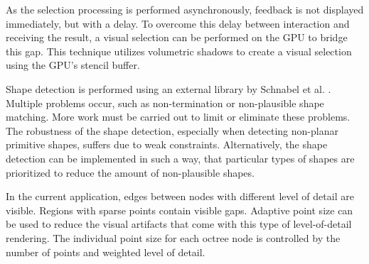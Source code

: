 \par

As the selection processing is performed asynchronously, feedback is not displayed immediately, but with a delay. To overcome this delay between interaction and receiving the result, a visual selection can be performed on the GPU \cite{rainer2016visual} to bridge this gap. This technique utilizes volumetric shadows to create a visual selection using the GPU's stencil buffer. 

\par

Shape detection is performed using an external library by Schnabel et al. \cite{schnabel-2007-software}. Multiple problems occur, such as non-termination or non-plausible shape matching. More work must be carried out to limit or eliminate these problems. The robustness of the shape detection, especially when detecting non-planar primitive shapes, suffers due to weak constraints. Alternatively, the shape detection can be implemented in such a way, that particular types of shapes are prioritized to reduce the amount of non-plausible shapes. 

\par

In the current application, edges between nodes with different level of detail are visible. Regions with sparse points contain visible gaps. Adaptive point size \cite{scheiblauer-thesis} can be used to reduce the visual artifacts that come with this type of level-of-detail rendering. The individual point size for each octree node is controlled by the number of points and weighted level of detail. 


